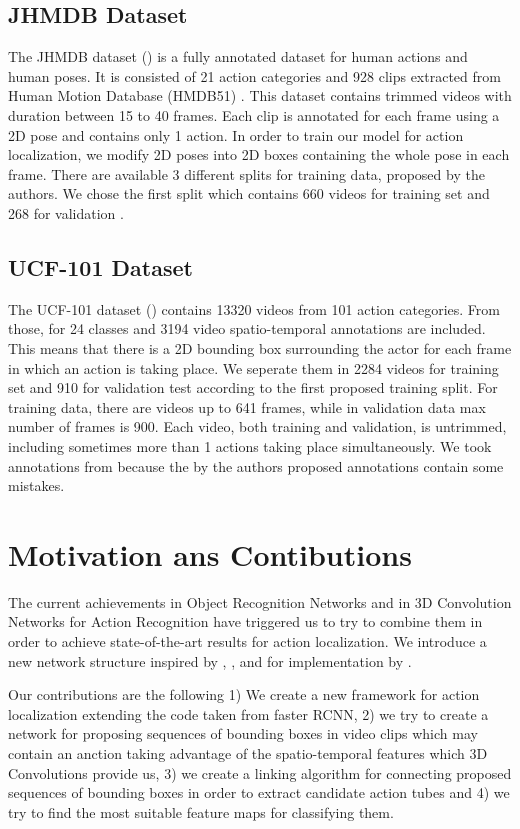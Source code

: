 \subsection{JHMDB Dataset}
The JHMDB dataset (\cite{Jhuang:ICCV:2013}) is a fully annotated dataset for human actions and human poses. It is consisted of 21 action categories and 928
clips extracted from Human Motion Database (HMDB51) \cite{Kuehne11}. This dataset contains trimmed videos with duration between
15 to 40 frames. Each clip is annotated for each frame using a 2D pose and contains only 1 action.
In order to train our model for action localization, we modify 2D poses into 2D boxes containing the whole pose in each frame.
There are available 3 different splits for training data, proposed by the authors. We chose the first split which contains 660
videos for training set and 268 for validation . 

\subsection{UCF-101 Dataset}
The UCF-101 dataset (\cite{soomro2012ucf101}) contains 13320 videos from 101 action categories.
From those, for 24 classes and 3194 video spatio-temporal annotations are included. This means that there is a 2D bounding box surrounding the actor for each frame in which an action is taking place.
We seperate them in 2284 videos for training set and 910 for validation test according to the
first proposed training split. For training data, there are videos up to 641 frames, while in validation data max number of frames is 900.
Each video, both training and validation, is untrimmed, including sometimes more than 1 actions taking place simultaneously.
We took annotations from
\cite{singh2016online} because the by the authors proposed annotations contain some mistakes.

\section{Motivation ans Contibutions}
The current achievements in Object Recognition Networks and in 3D Convolution Networks for Action Recognition have triggered us to try
to combine them in order to achieve state-of-the-art results for action localization. We introduce a new network structure inspired by
\cite{DBLP:journals/corr/HouCS17}, \cite{DBLP:journals/corr/abs-1712-09184},\cite{Ren:2015:FRT:2969239.2969250} and for implementation
by \cite{jjfaster2rcnn}.

Our contributions are the following 1) We create a new framework for action localization extending the code taken from faster RCNN,
2) we try to create a network for proposing sequences of bounding boxes in video clips which may contain an anction taking advantage
of the spatio-temporal features which 3D Convolutions provide us, 3) we create a linking algorithm for connecting proposed sequences of
bounding boxes in order to extract candidate action tubes and 4) we try to find the most suitable feature maps for classifying them.

